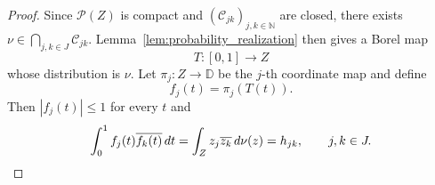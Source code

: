 \documentclass[10pt,a4paper]{amsart}
\def\D{{\mathbb D}}
\def\N{{\mathbb N}}
\begin{document}
\begin{proof}
Since $\mathcal P(Z)$ is compact and $(\mathcal C_{jk})_{j,k\in\N}$ are closed, there exists $\nu\in\bigcap_{j,k\in J}\mathcal C_{jk}$. Lemma~\ref{lem:probability_realization} then gives a Borel map
\begin{equation*}
T:[0,1]\to Z
\end{equation*}
whose distribution is $\nu$. Let $\pi_j:Z\to\D$
be the $j$-th coordinate map and define
\begin{equation*}
f_j(t)=\pi_j(T(t)).
\end{equation*}
Then $|f_j(t)|\le1$ for every $t$ and
\begin{equation*}
\int_0^1 f_j(t)\overline{f_k(t)}\,dt
=
\int_Z z_j \overline{z_k}\, d\nu(z)
=
h_{jk},
\qquad j,k\in J.\qedhere
\end{equation*}
\end{proof}
\end{document}

